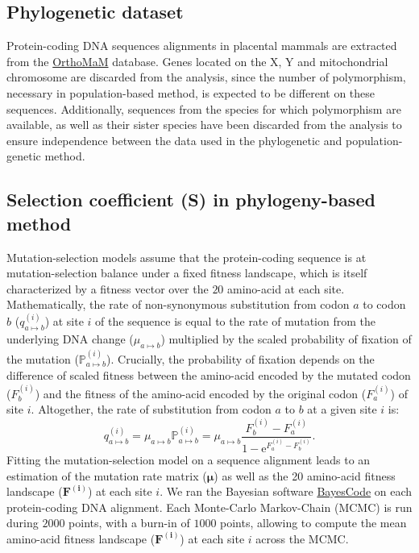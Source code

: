 \documentclass{article}
\newcommand{\UniDimArray}[1]{\bm{#1}}
\newcommand{\e}{\mathrm{e}}
\newcommand{\proba}{\mathbb{P}}
\begin{document}
    \subsection{Phylogenetic dataset}

    Protein-coding DNA sequences alignments in placental mammals are extracted from the \href{https://www.orthomam.univ-montp2.fr}{OrthoMaM} database\cite{ranwez_orthomam_2007, douzery_orthomam_2014, scornavacca_orthomam_2019}.
    Genes located on the X, Y and mitochondrial chromosome are discarded from the analysis, since the number of polymorphism, necessary in population-based method, is expected to be different on these sequences.
    Additionally, sequences from the species for which polymorphism are available, as well as their sister species have been discarded from the analysis to ensure independence between the data used in the phylogenetic and population-genetic method.

    \subsection{Selection coefficient (S) in phylogeny-based method}
    \label{subsec:s-phylogeny-method}

    Mutation-selection models assume that the protein-coding sequence is at mutation-selection balance under a fixed fitness landscape, which is itself characterized by a fitness vector over the $20$ amino-acid at each site\cite{yang_mutationselection_2008, halpern_evolutionary_1998, rodrigue_mechanistic_2010}.
    Mathematically, the rate of non-synonymous substitution from codon $a$ to codon $b$ ($q_{a \mapsto b}^{(i)}$) at site $i$ of the sequence is equal to the rate of mutation from the underlying DNA change ($\mu_{a \mapsto b}$) multiplied by the scaled probability of fixation of the mutation ($\proba_{a \mapsto b}^{(i)}$).
    Crucially, the probability of fixation depends on the difference of scaled fitness between the amino-acid encoded by the mutated codon ($F_b^{(i)}$) and the fitness of the amino-acid encoded by the original codon ($F_a^{(i)}$) of site $i$\cite{wright_evolution_1931, fisher_genetical_1930}.
    Altogether, the rate of substitution from codon $a$ to $b$ at a given site $i$ is:
    \begin{equation}
        q_{a \mapsto b}^{(i)} = \mu_{a \mapsto b} \proba_{a \mapsto b}^{(i)} = \mu_{a \mapsto b} \dfrac{F_b^{(i)} - F_a^{(i)}}{1 - \e^{F_a^{(i)} - F_b^{(i)}}}.\label{eq:equation}
    \end{equation}
    Fitting the mutation-selection model on a sequence alignment leads to an estimation of the mutation rate matrix ($\UniDimArray{\mu}$) as well as the 20 amino-acid fitness landscape ($\UniDimArray{F^{(i)}}$) at each site $i$.
    We ran the Bayesian software \href{https://github.com/bayesiancook/bayescode}{BayesCode} on each protein-coding DNA alignment\cite{lartillot_phylobayes_2013, rodrigue_detecting_2017}.
    Each Monte-Carlo Markov-Chain (MCMC) is run during $2000$ points, with a burn-in of $1000$ points, allowing to compute the mean amino-acid fitness landscape ($\UniDimArray{F^{(i)}}$) at each site $i$ across the MCMC\@.
\end{document}
